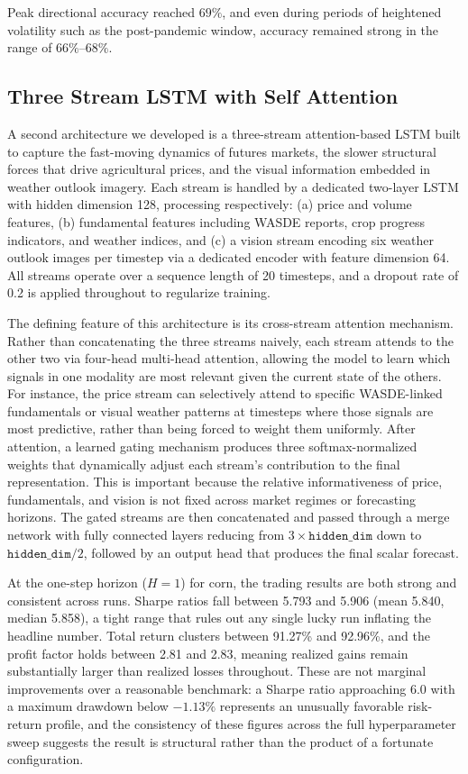 \documentclass{article} %
\begin{document}
Peak directional accuracy reached $69\%$, and even during periods of heightened volatility such as the post-pandemic window, accuracy remained strong in the range of $66\%$--$68\%$.


\subsection{Three Stream LSTM with Self Attention}
A second architecture we developed is a three-stream attention-based LSTM built to capture the fast-moving dynamics of futures markets, the slower structural forces that drive agricultural prices, and the visual information embedded in weather outlook imagery. Each stream is handled by a dedicated two-layer LSTM with hidden dimension 128, processing respectively: (a) price and volume features, (b) fundamental features including WASDE reports, crop progress indicators, and weather indices, and (c) a vision stream encoding six weather outlook images per timestep via a dedicated encoder with feature dimension 64. All streams operate over a sequence length of 20 timesteps, and a dropout rate of 0.2 is applied throughout to regularize training.

The defining feature of this architecture is its cross-stream attention mechanism. Rather than concatenating the three streams naively, each stream attends to the other two via four-head multi-head attention, allowing the model to learn which signals in one modality are most relevant given the current state of the others. For instance, the price stream can selectively attend to specific WASDE-linked fundamentals or visual weather patterns at timesteps where those signals are most predictive, rather than being forced to weight them uniformly. After attention, a learned gating mechanism produces three softmax-normalized weights that dynamically adjust each stream's contribution to the final representation. This is important because the relative informativeness of price, fundamentals, and vision is not fixed across market regimes or forecasting horizons. The gated streams are then concatenated and passed through a merge network with fully connected layers reducing from $3 \times \texttt{hidden\_dim}$ down to $\texttt{hidden\_dim} / 2$, followed by an output head that produces the final scalar forecast.

At the one-step horizon ($H=1$) for corn, the trading results are both strong and consistent across runs. Sharpe ratios fall between 5.793 and 5.906 (mean 5.840, median 5.858), a tight range that rules out any single lucky run inflating the headline number. Total return clusters between 91.27\% and 92.96\%, and the profit factor holds between 2.81 and 2.83, meaning realized gains remain substantially larger than realized losses throughout. These are not marginal improvements over a reasonable benchmark: a Sharpe ratio approaching 6.0 with a maximum drawdown below $-1.13\%$ represents an unusually favorable risk-return profile, and the consistency of these figures across the full hyperparameter sweep suggests the result is structural rather than the product of a fortunate configuration.
\end{document}
